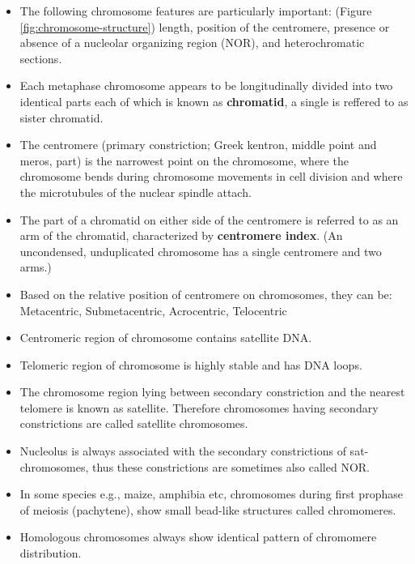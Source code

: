 \documentclass[11pt,dvipsnames,ignorenonframetext,aspectratio=169]{beamer}
\providecommand{\tightlist}{%
  \setlength{\itemsep}{0pt}\setlength{\parskip}{0pt}}
\begin{document}
\begin{frame}{}
\protect\hypertarget{section-2}{}

\begin{itemize}
\tightlist
\item
  The following chromosome features are particularly important: (Figure
  \ref{fig:chromosome-structure}) length, position of the centromere,
  presence or absence of a nucleolar organizing region (NOR), and
  heterochromatic sections.
\item
  Each metaphase chromosome appears to be longitudinally divided into
  two identical parts each of which is known as \textbf{chromatid}, a
  single is reffered to as sister chromatid.
\item
  The centromere (primary constriction; Greek kentron, middle point and
  meros, part) is the narrowest point on the chromosome, where the
  chromosome bends during chromosome movements in cell division and
  where the microtubules of the nuclear spindle attach.
\item
  The part of a chromatid on either side of the centromere is referred
  to as an arm of the chromatid, characterized by \textbf{centromere
  index}. (An uncondensed, unduplicated chromosome has a single
  centromere and two arms.)
\item
  Based on the relative position of centromere on chromosomes, they can
  be: Metacentric, Submetacentric, Acrocentric, Telocentric
\end{itemize}

\end{frame}

\begin{frame}{}
\protect\hypertarget{section-3}{}

\begin{itemize}
\tightlist
\item
  Centromeric region of chromosome contains satellite DNA.
\item
  Telomeric region of chromosome is highly stable and has DNA loops.
\item
  The chromosome region lying between secondary constriction and the
  nearest telomere is known as satellite. Therefore chromosomes having
  secondary constrictions are called satellite chromosomes.
\item
  Nucleolus is always associated with the secondary constrictions of
  sat-chromosomes, thus these constrictions are sometimes also called
  NOR.
\item
  In some species e.g., maize, amphibia etc, chromosomes during first
  prophase of meiosis (pachytene), show small bead-like structures
  called chromomeres.
\item
  Homologous chromosomes always show identical pattern of chromomere
  distribution.
\end{itemize}

\end{frame}
\end{document}

